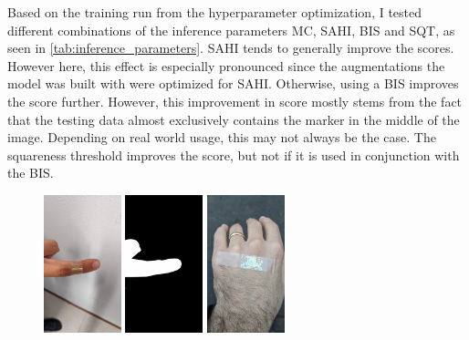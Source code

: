 \documentclass[10pt]{book}
\begin{document}
Based on the training run from the hyperparameter optimization, I tested different combinations of the inference parameters \ac{MC}, \ac{SAHI}, \ac{BIS} and \ac{SQT}, as seen in \autoref{tab:inference_parameters}. \ac{SAHI} tends to generally improve the scores. However here, this effect is especially pronounced since the augmentations the model was built with were optimized for \ac{SAHI}. Otherwise, using a \ac{BIS} improves the score further. However, this improvement in score mostly stems from the fact that the testing data almost exclusively contains the marker in the middle of the image. Depending on real world usage, this may not always be the case. The squareness threshold improves the score, but not if it is used in conjunction with the \ac{BIS}. 

\begin{figure}
  \centering
     {\includegraphics[width=0.2\textwidth]{image/foreground_mask_example_finger}}
     {\includegraphics[width=0.2\textwidth]{image/foreground_mask_example_finger_mask}}
     {\includegraphics[width=0.2\textwidth]{image/foreground_mask_example_hand}}

\end{figure}
\end{document}
